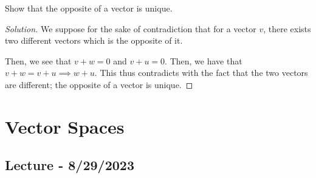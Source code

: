 \documentclass[openany]{book}
\newenvironment{solution}{\begin{proof}[Solution]}{\end{proof}}
\begin{document}
	\begin{hw}
		Show that the opposite of a vector is unique.
	\end{hw}
	\begin{solution}
		We suppose for the sake of contradiction that for a vector $v$, there exists two different vectors which is the opposite of it.
		
		Then, we see that $v + w = 0$ and $v + u = 0$. Then, we have that $v + w = v + u \implies w + u$. This thus contradicts with the fact that the two vectors are different; the opposite of a vector is unique.
	\end{solution}
	
	\chapter{Vector Spaces}
	\section{Lecture - 8/29/2023}
\end{document}
